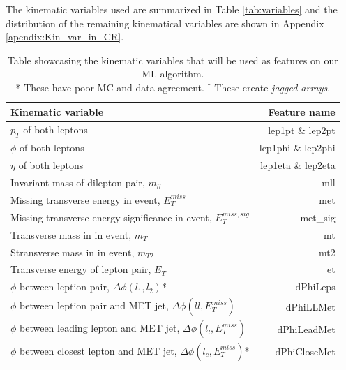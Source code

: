 \documentclass[12pt, a4paper]{book}
\begin{document}
\clearpage\noindent The kinematic variables used are summarized in Table \ref{tab:variables} and the distribution of the remaining kinematical variables are shown in Appendix \ref{apendix:Kin_var_in_CR}.
\begin{table}[!h]
    \centering
    \caption[Kinematic variables used as features]{Table showcasing the kinematic variables that will be used as features on our ML algorithm.\\ * These have poor MC and data agreement. $^\dagger$ These create \textit{jagged arrays}.}
    \begin{tabular}{l|r}\midrule\midrule
        Kinematic variable                                                              & Feature name          \\\midrule
        $p_T$ of both leptons                                                           & lep1pt \& lep2pt      \\
        $\phi$ of both leptons                                                          & lep1phi \& lep2phi    \\
        $\eta$ of both leptons                                                          & lep1eta \& lep2eta    \\
        Invariant mass of dilepton pair, $m_{ll}$                                       & mll \\
        Missing transverse energy in event, $E_T^{miss}$                                & met \\
        Missing transverse energy significance in event, $E_T^{miss,sig}$               & met\_sig \\
        Transverse mass in in event, $m_T$                                              & mt \\
        Stransverse mass in in event, $m_{T2}$                                          & mt2\\
        Transverse energy of lepton pair, $E_T$                                         & et \\
        $\phi$ between leption pair, $\Delta\phi(l_1,l_2)$*                             & dPhiLeps \\
        $\phi$ between leption pair and MET jet, $\Delta\phi(ll,E_T^{miss})$            & dPhiLLMet \\
        $\phi$ between leading lepton and MET jet, $\Delta\phi(l_l,E_T^{miss})$         & dPhiLeadMet \\
        $\phi$ between closest lepton and MET jet, $\Delta\phi(l_c,E_T^{miss})$*        & dPhiCloseMet \\

\end{tabular}
\end{table}
\end{document}
